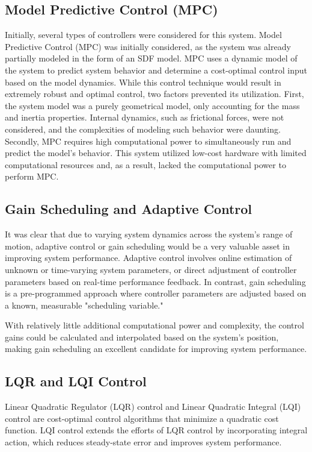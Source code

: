 \subsection{Model Predictive Control (MPC)}

Initially, several types of controllers were considered for this system. Model Predictive Control (MPC) was initially considered, as the system was already partially modeled in the form of an SDF model. MPC uses a dynamic model of the system to predict system behavior and determine a cost-optimal control input based on the model dynamics. While this control technique would result in extremely robust and optimal control, two factors prevented its utilization. First, the system model was a purely geometrical model, only accounting for the mass and inertia properties. Internal dynamics, such as frictional forces, were not considered, and the complexities of modeling such behavior were daunting. Secondly, MPC requires high computational power to simultaneously run and predict the model's behavior. This system utilized low-cost hardware with limited computational resources and, as a result, lacked the computational power to perform MPC.

\subsection{Gain Scheduling and Adaptive Control}

It was clear that due to varying system dynamics across the system's range of motion, adaptive control or gain scheduling would be a very valuable asset in improving system performance. Adaptive control involves online estimation of unknown or time-varying system parameters, or direct adjustment of controller parameters based on real-time performance feedback. In contrast, gain scheduling is a pre-programmed approach where controller parameters are adjusted based on a known, measurable "scheduling variable."

With relatively little additional computational power and complexity, the control gains could be calculated and interpolated based on the system's position, making gain scheduling an excellent candidate for improving system performance.



\subsection{LQR and LQI Control}

Linear Quadratic Regulator (LQR) control and Linear Quadratic Integral (LQI) control are cost-optimal control algorithms that minimize a quadratic cost function. LQI control extends the efforts of LQR control by incorporating integral action, which reduces steady-state error and improves system performance.

